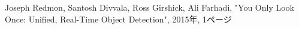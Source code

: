 \documentclass[../main]{subfiles}
\begin{document}
\begin{thebibliography}{9}
%
%
Joseph Redmon, Santosh Divvala, Ross Girshick, Ali Farhadi, "You Only Look Once: Unified, Real-Time Object Detection", 2015年, 1ページ
\end{thebibliography}
\end{document}
